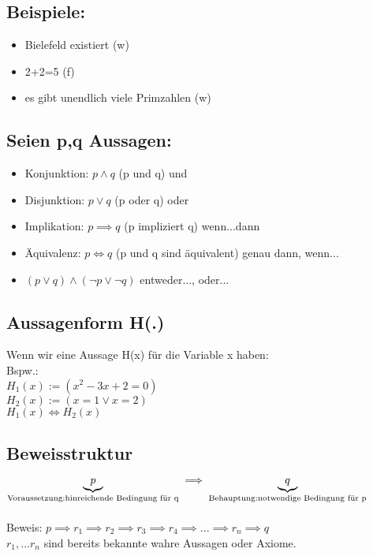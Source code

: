 \documentclass{article}
\begin{document}
       \subsection*{Beispiele:}
            \begin{itemize}
                \item Bielefeld existiert (w)
                \item 2+2=5 (f)
                \item es gibt unendlich viele Primzahlen (w)
            \end{itemize}

       \subsection*{Seien p,q Aussagen:}
            \begin{itemize}
                \item Konjunktion: $p \land q$ (p und q) \glqq und\grqq{}
                \item Disjunktion: $p\lor q$ (p oder q) \glqq oder\grqq{}
                \item Implikation: $p \implies q$ (p impliziert q) \glqq wenn...dann\grqq{}
                \item Äquivalenz: $p\iff q$ (p und q sind äquivalent) \glqq genau dann, wenn...\grqq{}
                \item $(p \lor q)\land (\lnot p\lor \lnot q)$ \glqq entweder..., oder...\grqq{}
            \end{itemize}

        \subsection*{Aussagenform H(.)}
            Wenn wir eine Aussage H(x) für die Variable x haben:\\
            Bspw.:\\
            $H_1(x):=(x^2-3x+2=0)$\\
            $H_2(x):=(x=1\lor x=2)$\\
            $H_1(x)\iff H_2(x)$
        
        \subsection*{Beweisstruktur}
            $\underbrace{p}_{\text{Voraussetzung:\\ hinreichende Bedingung für q}}\implies \underbrace{q}_{\text{Behauptung:\\ notwendige Bedingung für p}}$\\\\
            Beweis: $p \implies r_1\implies r_2\implies r_3\implies r_4\implies ... \implies r_n\implies q$\\
            $r_1, ... r_n$ sind bereits bekannte wahre Aussagen oder Axiome.
        
\end{document}
